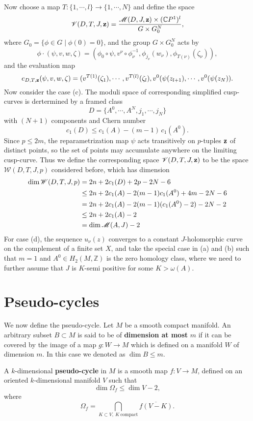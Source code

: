 \documentclass[twoside]{article}
\begin{document}
Now choose a map $T\colon \{1,\cdots,l\}\rightarrow \{1,\cdots,N\}$ and define the space
\[\mathscr{V}(D,T,J,\mathbf{z})=\frac{\mathscr{M}(D,J,\mathbf{z})\times (\mathbb{C}P^{1})^l}{G\times G^N_0},\]
where $G_0=\{\phi\in G \mid \phi(0)=0  \}$, and the group $G\times G^N_0$ acts by
\[\phi\cdot (\psi,v,w,\zeta)=(\phi_0\circ\psi,v^\nu\circ\phi_\nu^{-1},\phi_{j_\nu}(w_\nu),\phi_{T(\nu)}(\zeta_\nu)),\]
and the evaluation map
\[e_{D,T,\mathbf{z}}(\psi,v,w,\zeta)=(v^{T(1)}(\zeta_1),\cdots,v^{T(l)}(\zeta_l),v^0(\psi(z_{l+1}),\cdots,v^0(\psi(z_N)).\]
Now consider the case (c). The moduli space of corresponding simplified cusp-curves is dertermined by a framed class
\[D=\{A^0,\cdots,A^N,j_1,\cdots,j_N  \}\]
with $(N+1)$ components and Chern number
\[c_1(D)\leq c_1(A)-(m-1)\,c_1(A^0).\]
Since $p\leq 2m$, the reparametrization map $\psi$ acts transitively on $p$-tuples $\mathbf{z}$ of distinct points, 
so the set of points may accumulate anywhere on the limiting cusp-curve. 
Thus we define the corresponding space $\mathscr{V}(D,T,J,\mathbf{z})$ 
to be the space $\mathscr{W}(D,T,J,p)$ considered before, which has dimension 
\[ \begin{aligned}
\dim\mathscr{W}(D,T,J,p)&=2n+2c_1(D)+2p-2N-6\\
&\leq 2n+2c_1(A)-2(m-1)c_1(A^0)+4m-2N-6\\
&=2n+2c_1(A)-2(m-1)(c_1(A^0)-2)-2N-2\\
&\leq 2n+2c_1(A)-2\\
&=\dim\mathscr{M}(A,J)-2
\end{aligned} \]
For case (d), the sequence $u_\nu(z)$ converges to a constant $J$-holomorphic curve 
on the complement of a finite set $X$, and take the special case in (a) and (b) such that 
$m=1$ and $A^0\in H_2(M,\mathbb{Z})$ is the zero homology class, 
where we need to further assume that $J$ is $K$-semi positive for some $K>\omega(A)$.

\section{Pseudo-cycles}

We now define the pseudo-cycle. Let $M$ be a smooth compact manifold. 
An arbitrary subset $B\subset M$ is said to be of \textbf{dimension at most} $m$ 
if it can be covered by the image of a map $g\colon W\rightarrow M$ 
which is defined on a manifold $W$ of dimension $m$. 
In this case we denoted as $\dim B\leq m$.

A $k$-dimensional \textbf{pseudo-cycle} in $M$ is a smooth map $f\colon V\rightarrow M$, 
defined on an oriented $k$-dimensional manifold $V$ such that 
\[\dim \Omega_f\leq \dim V-2,\]
where
\[\Omega_f=\bigcap_{K\subset V,\: K\: \mathrm{compact}}\overline{f(V-K)}.\]
\end{document}

